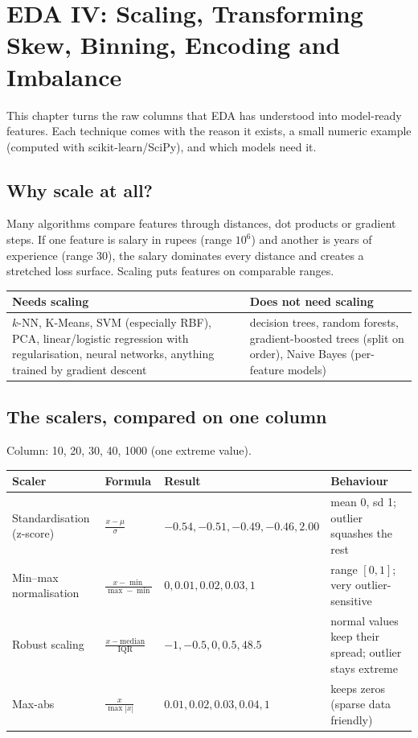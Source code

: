 \chapter{EDA IV: Scaling, Transforming Skew, Binning, Encoding and Imbalance}

This chapter turns the raw columns that EDA has understood into model-ready features. Each technique comes with the reason it exists, a small numeric
example (computed with scikit-learn/SciPy), and which models need it.

\section{Why scale at all?}
Many algorithms compare features through distances, dot products or gradient steps. If one feature is salary in rupees (range $10^6$) and another is years of
experience (range 30), the salary dominates every distance and creates a stretched loss surface. Scaling puts features on comparable ranges.
\begin{center}\small
\begin{tabularx}{\linewidth}{X X}
\toprule
Needs scaling & Does not need scaling\\
\midrule
$k$-NN, K-Means, SVM (especially RBF), PCA, linear/logistic regression with regularisation, neural networks, anything trained by gradient descent &
decision trees, random forests, gradient-boosted trees (split on order), Naive Bayes (per-feature models)\\
\bottomrule
\end{tabularx}
\end{center}

\section{The scalers, compared on one column}
Column: 10, 20, 30, 40, 1000 (one extreme value).
\begin{center}\small
\begin{tabularx}{\linewidth}{>{\raggedright\arraybackslash}p{2.3cm} l >{\raggedright\arraybackslash}X >{\raggedright\arraybackslash}X}
\toprule
Scaler & Formula & Result & Behaviour\\
\midrule
Standardisation (z-score) & $\frac{x - \mu}{\sigma}$ & $-0.54, -0.51, -0.49, -0.46, 2.00$ & mean 0, sd 1; outlier squashes the rest\\
Min--max normalisation & $\frac{x - \min}{\max - \min}$ & $0, 0.01, 0.02, 0.03, 1$ & range $[0,1]$; very outlier-sensitive\\
Robust scaling & $\frac{x - \text{median}}{\text{IQR}}$ & $-1, -0.5, 0, 0.5, 48.5$ & normal values keep their spread; outlier stays extreme\\
Max-abs & $\frac{x}{\max|x|}$ & $0.01, 0.02, 0.03, 0.04, 1$ & keeps zeros (sparse data friendly)\\
\bottomrule
\end{tabularx}
\end{center}

